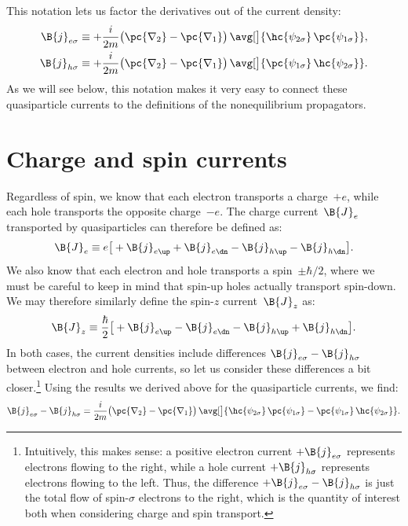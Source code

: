 This notation lets us factor the derivatives out of the current density:
\begin{align}
  \B{j}_{e\sigma} &\equiv
  +\frac{i}{2m} \big(\pc{\nabla_2} - \pc{\nabla_1}\big) \,
  \avg[\big]{\hc{\psi_{2 \sigma}}\, \pc{\psi_{1 \sigma}}} ,\\
  \B{j}_{h\sigma} &\equiv
  +\frac{i}{2m} \big(\pc{\nabla_2} - \pc{\nabla_1}\big) \,
  \avg[\big]{\pc{\psi_{1 \sigma}}\, \hc{\psi_{2 \sigma}}} .
\end{align}
As we will see below, this notation makes it very easy to connect these quasiparticle currents to the definitions of the nonequilibrium propagators.

\section{Charge and spin currents}
Regardless of spin, we know that each electron transports a charge~$+e$, while each hole transports the opposite charge~$-e$.
The charge current~$\B{J}_e$ transported by quasiparticles can therefore be defined as:
\begin{equation}
  \B{J}_e \equiv e\big[ +\B{j}_{e\up} + \B{j}_{e\dn} - \B{j}_{h\up} - \B{j}_{h\dn} \big].
\end{equation}
We also know that each electron and hole transports a spin~$\pm\hbar/2$, where we must be careful to keep in mind that spin-up holes actually transport spin-down.
We may therefore similarly define the spin-$z$ current~$\B{J}_z$ as:
\begin{equation}
  \B{J}_z \equiv \frac{\hbar}{2}\big[ +\B{j}_{e\up} - \B{j}_{e\dn} - \B{j}_{h\up} + \B{j}_{h\dn} \big].
\end{equation}
In both cases, the current densities include differences $\B{j}_{e\sigma} - \B{j}_{h\sigma}$ between electron and hole currents, so let us consider these differences a bit closer.\footnote{Intuitively, this makes sense: a positive electron current $+\B{j}_{e\sigma}$ represents electrons flowing to the right, while a hole current $+\B{j}_{h\sigma}$ represents electrons flowing to the left. Thus, the difference $+\B{j}_{e\sigma} - \B{j}_{h\sigma}$ is just the total flow of spin-$\sigma$ electrons to the right, which is the quantity of interest both when considering charge and spin transport.}
Using the results we derived above for the quasiparticle currents, we find:
\begin{align}
  \B{j}_{e\sigma} - \B{j}_{h\sigma} =
  \frac{i}{2m} \big(\pc{\nabla_2} - \pc{\nabla_1}\big) \,
  \avg[\big]{\hc{\psi_{2 \sigma}}\, \pc{\psi_{1 \sigma}} -
             \pc{\psi_{1 \sigma}}\, \hc{\psi_{2 \sigma}}} .
\end{align}
